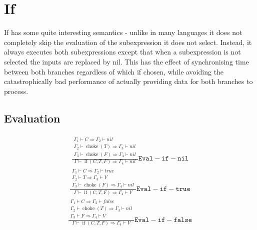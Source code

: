\documentclass{scrartcl}
\DeclareMathOperator{\ifop}{if}
\DeclareMathOperator{\choke}{choke}
\begin{document}
    \section{If}
    
    If has some quite interesting semantics - unlike in many languages it does not completely skip
    the evaluation of the subexpression it does not select. Instead, it always executes both
    subexpressions except that when a subexpression is not selected the inputs are replaced
    by nil. This has the effect of synchronising time between both branches regardless of which
    if chosen, while avoiding the catastrophically bad performance of actually providing data
    for both branches to process.
    
    \subsection{Evaluation}
    
    \begin{align*}
    \frac{
        \begin{matrix}
        \Gamma_1 \vdash C \Rightarrow \Gamma_2 \vdash nil \\
        \Gamma_2 \vdash \choke(T) \Rightarrow \Gamma_3 \vdash nil \\
        \Gamma_3 \vdash \choke(F) \Rightarrow \Gamma_4 \vdash nil
        \end{matrix}
    }{
        \Gamma \vdash \ifop(C, T, F) \Rightarrow \Gamma_4 \vdash nil
    }\mathtt{Eval-if-nil}
    \end{align*}
    \begin{align*}
    \frac{
        \begin{matrix}
        \Gamma_1 \vdash C \Rightarrow \Gamma_2 \vdash true \\
        \Gamma_2 \vdash T \Rightarrow \Gamma_3 \vdash V \\
        \Gamma_3 \vdash \choke(F) \Rightarrow \Gamma_4 \vdash nil
        \end{matrix}
    }{
        \Gamma \vdash \ifop(C, T, F) \Rightarrow \Gamma_4 \vdash V
    }\mathtt{Eval-if-true}
    \end{align*}
    \begin{align*}
    \frac{
        \begin{matrix}
        \Gamma_1 \vdash C \Rightarrow \Gamma_2 \vdash false \\
        \Gamma_2 \vdash \choke(T) \Rightarrow \Gamma_3 \vdash nil \\
        \Gamma_3 \vdash F \Rightarrow \Gamma_4 \vdash V
        \end{matrix}
    }{
        \Gamma \vdash \ifop(C, T, F) \Rightarrow \Gamma_4 \vdash V
    }\mathtt{Eval-if-false}
    \end{align*}
    
\end{document}
